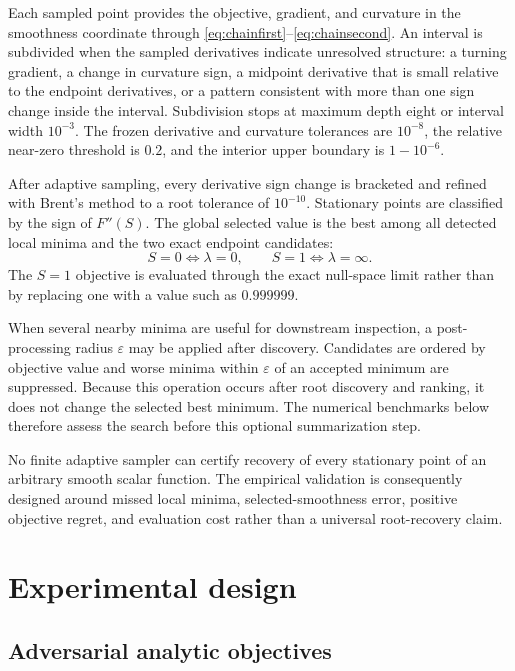 \documentclass[english]{smcca}
\begin{document}
Each sampled point provides the objective, gradient, and curvature in the smoothness coordinate through \eqref{eq:chainfirst}--\eqref{eq:chainsecond}. An interval is subdivided when the sampled derivatives indicate unresolved structure: a turning gradient, a change in curvature sign, a midpoint derivative that is small relative to the endpoint derivatives, or a pattern consistent with more than one sign change inside the interval. Subdivision stops at maximum depth eight or interval width \(10^{-3}\). The frozen derivative and curvature tolerances are \(10^{-8}\), the relative near-zero threshold is \(0.2\), and the interior upper boundary is \(1-10^{-6}\).

After adaptive sampling, every derivative sign change is bracketed and refined with Brent's method \cite{brent1971zero} to a root tolerance of \(10^{-10}\). Stationary points are classified by the sign of \(F''(S)\). The global selected value is the best among all detected local minima and the two exact endpoint candidates:
\[
S=0\Longleftrightarrow\lambda=0,
\qquad
S=1\Longleftrightarrow\lambda=\infty.
\]
The \(S=1\) objective is evaluated through the exact null-space limit rather than by replacing one with a value such as \(0.999999\).

When several nearby minima are useful for downstream inspection, a post-processing radius \(\varepsilon\) may be applied after discovery. Candidates are ordered by objective value and worse minima within \(\varepsilon\) of an accepted minimum are suppressed. Because this operation occurs after root discovery and ranking, it does not change the selected best minimum. The numerical benchmarks below therefore assess the search before this optional summarization step.

No finite adaptive sampler can certify recovery of every stationary point of an arbitrary smooth scalar function. The empirical validation is consequently designed around missed local minima, selected-smoothness error, positive objective regret, and evaluation cost rather than a universal root-recovery claim.

\section{Experimental design}

\subsection{Adversarial analytic objectives}
\end{document}
